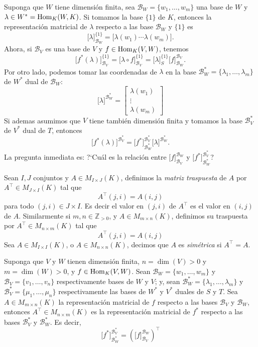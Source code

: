 \begin{obs}
Suponga que $W$ tiene dimensi\'on finita, sea $\mathcal{B}_W=\{w_1,\ldots,w_m\}$ una base de $W$ y $\lambda\in W^*=\operatorname{Hom}_K(W,K)$. Si tomamos la base $\{1\}$ de $K$, entonces la representaci\'on matricial de $\lambda$ respecto a las base $\mathcal{B}_W$ y $\{1\}$ es
\[
\Big[\lambda\Big]^{\{1\}}_{\mathcal{B}_W}=\Big[\lambda(w_1)\cdots\lambda(w_m)\Big].
\]
Ahora, si $\mathcal{B}_V$ es una base de $V$ y $f\in\operatorname{Hom}_K(V,W)$, tenemos
\[
\Big[f^*(\lambda)\Big]^{\{1\}}_{\mathcal{B}_V}=\Big[\lambda\circ f\Big]^{\{1\}}_{\mathcal{B}_V}=\Big[\lambda\Big]^{\{1\}}_S\Big[f\Big]^{\mathcal{B}_V}_{\mathcal{B}_W}.
\]
Por otro lado, podemos tomar las coordenadas de $\lambda$ en la base $\mathcal{B}_W^*=\{\lambda_1,\ldots,\lambda_m\}$ de $W^*$ dual de $\mathcal{B}_W$:
\[
\Big[\lambda\Big]^{\mathcal{B}_W^*}=\left[\begin{array}{c} \lambda(w_1)\\ \vdots \\ \lambda(w_m)\end{array}\right]
\]
Si ademas asumimos que $V$ tiene tambi\'en dimensi\'on finita y tomamos la base $\mathcal{B}_V^*$  de $V^*$ dual de $T$, entonces
\[
\Big[f^*(\lambda)\Big]^{\mathcal{B}_V^*}=\Big[f^*\Big]^{\mathcal{B}_V^*}_{\mathcal{B}_W^*}\Big[\lambda\Big]^{\mathcal{B}_W^*}.
\]
La pregunta inmediata es: ?`Cu\'al es la relaci\'on entre $\Big[f\Big]^{\mathcal{B}_W}_{\mathcal{B}_V}$ y $\Big[f^*\Big]^{\mathcal{B}_V^*}_{\mathcal{B}_W^*}$?
\end{obs}

\begin{defn}
Sean $I,J$ conjuntos y $A\in M_{I\times J}(K)$, definimos la \emph{matriz traspuesta} de $A$ por $A^\intercal\in M_{J\times I}(K)$ tal que
\[
A^\intercal(j,i)=A(i,j)
\]
para todo $(j,i)\in J\times I$. Es decir el valor en $(j,i)$ de $A^\intercal$ es el valor en $(i,j)$ de $A$. Similarmente si $m,n\in\mathbb{Z}_{>0}$, y $A\in M_{m\times n}(K)$, definimos su traspuesta por $A^\intercal\in M_{n\times m}(K)$ tal que
\[
A^\intercal(j,i)=A(i,j)
\]
Sea $A\in M_{I\times I}(K)$, o $A\in M_{n\times n}(K)$, decimos que $A$ es \emph{sim\'etrica} si $A^\intercal=A$.
\end{defn}

\begin{teo}
Suponga que $V$ y $W$ tienen dimensi\'on finita, $n=\dim(V)>0$ y $m=\dim(W)>0$, y $f\in\operatorname{Hom}_K(V,W)$. Sean $\mathcal{B}_W=\{w_1,\ldots,w_m\}$ y $\mathcal{B}_V=\{v_1,\ldots,v_n\}$ respectivamente bases de $W$ y $V$; y, sean $\mathcal{B}_W^*=\{\lambda_1,\ldots,\lambda_m\}$ y $\mathcal{B}_V^*=\{\mu_1,\ldots,\mu_n\}$ respectivamente las bases de $W^*$ y $V^*$ duales de $S$ y $T$. Sea $A\in M_{m\times n}(K)$ la representaci\'on matricial de $f$ respecto a las bases $\mathcal{B}_V$ y $\mathcal{B}_W$, entonces $A^\intercal\in M_{n\times m}(K)$ es la representaci\'on matricial de $f^*$ respecto a las bases $\mathcal{B}_V^*$ y $\mathcal{B}_W^*$. Es decir,
\[
\Big[f^*\Big]^{\mathcal{B}_V^*}_{\mathcal{B}_W^*}=\left(\Big[f\Big]^{\mathcal{B}_W}_{\mathcal{B}_V}\right)^\intercal 
\] 
\end{teo}

